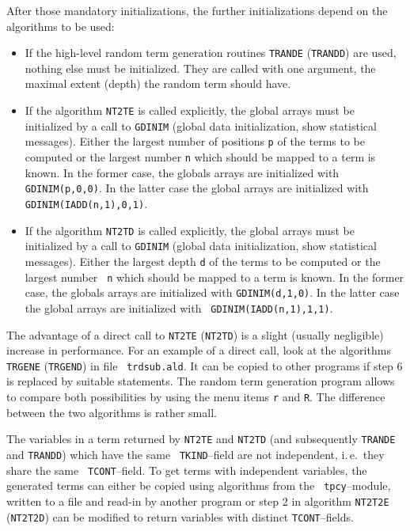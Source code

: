 After those mandatory initializations, the further initializations
depend on the algorithms to be used:
\begin{itemize}
\item If the high-level random term generation routines {\tt TRANDE}
   ({\tt TRANDD}) are used, nothing else must be initialized. They
   are called with one argument, the maximal extent (depth) the
   random term should have.
\item If the algorithm {\tt NT2TE}  is called explicitly, the global
   arrays must be initialized by a call to {\tt GDINIM} (global data
   initialization, show statistical messages).  Either the largest
   number of positions {\tt p} of the terms to be computed or the
   largest number {\tt n} which should be mapped to a term is known.
   In the former case, the globals arrays are initialized with {\tt
   GDINIM(p,0,0)}. In the latter case the global arrays are initialized
   with {\tt GDINIM(IADD(n,1),0,1)}.
\item If the algorithm {\tt NT2TD}  is called explicitly, the global
   arrays must be initialized by a call to {\tt GDINIM} (global data
   initialization, show statistical messages).  Either the largest
   depth {\tt d} of the terms to be computed or the largest number {\tt
   n} which should be mapped to a term is known.  In the former case,
   the globals arrays are initialized with {\tt GDINIM(d,1,0)}. In the
   latter case the global arrays are initialized with {\tt
   GDINIM(IADD(n,1),1,1)}.
\end{itemize}
The advantage of a direct call to {\tt NT2TE} ({\tt NT2TD}) is a slight
(usually negligible) increase in performance. For an example of a direct
call, look at the algorithms {\tt TRGENE} ({\tt TRGEND}) in file {\tt
trdsub.ald}. It can be copied to other programs if step 6 is
replaced by suitable statements. The random term generation program
allows to compare both possibilities by using the menu items {\tt r}
and {\tt R}. The difference between the two algorithms is rather
small.

The variables in a term returned by {\tt NT2TE} and {\tt NT2TD} (and
subsequently {\tt TRANDE} and {\tt TRANDD}) which have the same {\tt
TKIND}--field are not independent, i.\,e.\ they share the same {\tt
TCONT}--field. To get terms with independent variables, the generated
terms can either be copied using algorithms from the {\tt
tpcy}--module, written to a file and read-in by another program or step
2 in algorithm {\tt NT2T2E} ({\tt NT2T2D}) can be modified to return
variables with distinct {\tt TCONT}--fields.

